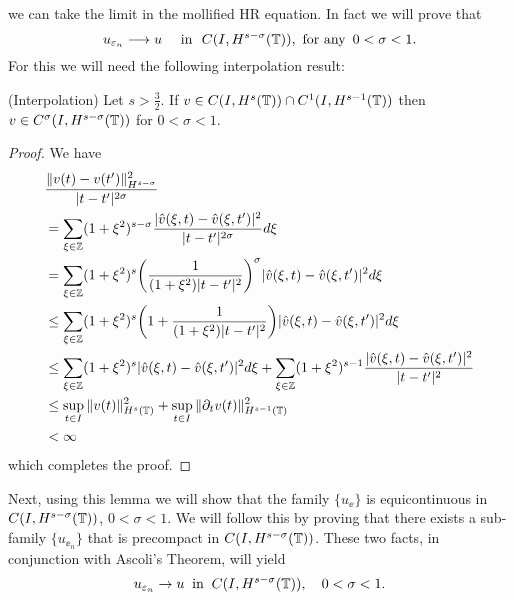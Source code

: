 we can take the limit in the mollified HR equation.
In fact we will prove that 
%
\begin{equation}
\label{strong-conv}
u_{\varepsilon_n}\longrightarrow u
\quad
 \ \text{in} \ \,\,   C(I, H^{s-\sigma}(\mathbb{T})),\ \text{for any} \
\, 0 < \sigma <
1.
\end{equation}
%
For this we will need the following interpolation  result:
%
%
%
%
\begin{lemma}
\label{interpolation-lem}
(Interpolation)     Let  $s > \frac{3}{2}$.
If $v \in C(I, H^s(\mathbb{T})) \cap C^1(I, H^{s-1}(\mathbb{T}))$
then $v \in C^\sigma (I, H^{s- \sigma}(\mathbb{T}))$ for  $0 < \sigma < 1$.
\end{lemma}
%
\begin{proof} We have
\begin{equation*}
\begin{split}
& \frac{\|v(t) - v(t')\|^2_{H^{s - \sigma}}}{|t - t'|^{2\sigma}}
\\
& = 
\sum_{\xi \in \mathbb{Z}} (1 + \xi^2)^{s- \sigma} 
\frac{|\hat{v}(\xi, t) - \hat{v}(\xi, t')|^2}{|t-t'|^{2\sigma}} d\xi\\
& = \sum_{\xi \in \mathbb{Z}} (1+\xi^2)^s 
\bigg(\frac{1}{(1+ \xi^2)|t - t'|^2} \bigg)^\sigma |\hat{v}(\xi, t)- \hat{v}(\xi, t')|^2 d\xi\\
& \leq \sum_{\xi \in \mathbb{Z}}(1+\xi^2)^s \bigg( 1 + \frac{1}{(1+\xi^2)|t-t'|^2} \bigg)
|\hat{v}(\xi,t) - \hat{v}(\xi,t')|^2 d\xi \\
& \leq \sum_{\xi \in \mathbb{Z}} (1+ \xi^2)^s |\hat{v}(\xi, t)- \hat{v}(\xi, t')|^2 d\xi
+ \sum_{\xi \in \mathbb{Z}} (1+ \xi^2)^{s-1} \frac{|\hat{v}(\xi, t) - \hat{v} (\xi, t')|^2}{|t-t'|^2} \\
& \leq  \sup_{t \in I} \|v(t)\|_{H^s(\mathbb{T})}^2 + \sup_{t \in I}
\| \partial_t v(t) \|_{H^{s-1}(\mathbb{T})}^2
\\
& < \infty
\end{split}
\end{equation*}
%
which completes the proof.
\end{proof}
%
Next, using this lemma we will show that the family $\{u_\ee\}$ is
equicontinuous in $C(I, H^{s-\sigma}(\mathbb{T}))$, $0 < \sigma < 1$. We
will follow this by proving that there exists a sub-family
$\{u_{\ee_n} \}$ that is precompact in $C(I,
H^{s-\sigma}(\mathbb{T}))$. These two facts, in conjunction with Ascoli's
Theorem, will yield
\begin{equation}
\label{strong-conv2}
u_{\varepsilon_n} \to u \; \; \text{in} \; \; C(I,H^{s-\sigma}(\mathbb{T})),
\quad
0 < \sigma < 1.
\end{equation}
%
%
%
%
%
